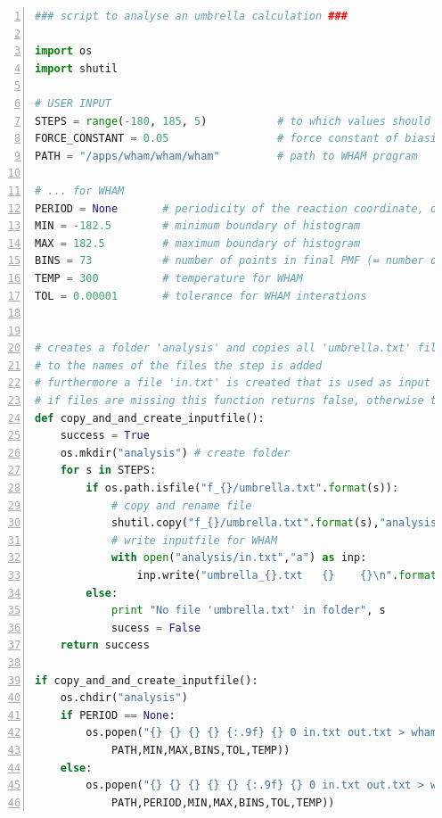 \documentclass[a4paper,11pt]{scrartcl}
\begin{document}
\begin{lstlisting}[frame=single,language=python,basicstyle=\footnotesize,commentstyle=\color{red},keywordstyle=\color{blue},stringstyle=\color{mygreen},numbers=left,escapechar=|]
### script to analyse an umbrella calculation ###

import os
import shutil

# USER INPUT
STEPS = range(-180, 185, 5)           # to which values should the restraint be set? 
FORCE_CONSTANT = 0.05                 # force constant of biasing potential
PATH = "/apps/wham/wham/wham"         # path to WHAM program

# ... for WHAM
PERIOD = None       # periodicity of the reaction coordinate, description see WHAM manual |\label{wham_period}|
MIN = -182.5        # minimum boundary of histogram
MAX = 182.5         # maximum boundary of histogram
BINS = 73           # number of points in final PMF (= number of bins)
TEMP = 300          # temperature for WHAM 
TOL = 0.00001       # tolerance for WHAM interations


# creates a folder 'analysis' and copies all 'umbrella.txt' files there
# to the names of the files the step is added
# furthermore a file 'in.txt' is created that is used as input for WHAM
# if files are missing this function returns false, otherwise true
def copy_and_and_create_inputfile():
    success = True
    os.mkdir("analysis") # create folder
    for s in STEPS:
        if os.path.isfile("f_{}/umbrella.txt".format(s)):
            # copy and rename file
            shutil.copy("f_{}/umbrella.txt".format(s),"analysis/umbrella_{}.txt".format(s))
            # write inputfile for WHAM
            with open("analysis/in.txt","a") as inp:         
                inp.write("umbrella_{}.txt   {}    {}\n".format(s,float(s),FORCE_CONSTANT))
        else:
            print "No file 'umbrella.txt' in folder", s
            sucess = False
    return success

if copy_and_and_create_inputfile():
    os.chdir("analysis")
    if PERIOD == None:
        os.popen("{} {} {} {} {:.9f} {} 0 in.txt out.txt > wham_output.txt".format(       |\label{runWHAM}|
            PATH,MIN,MAX,BINS,TOL,TEMP))
    else:
        os.popen("{} {} {} {} {} {:.9f} {} 0 in.txt out.txt > wham_output.txt".format(
            PATH,PERIOD,MIN,MAX,BINS,TOL,TEMP))
\end{lstlisting}
\end{document}
